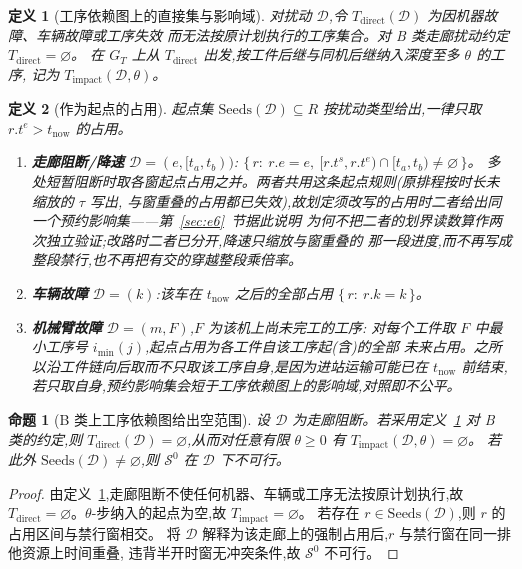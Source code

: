 \documentclass[manuscript,screen,review]{acmart}
\newtheorem{definition}{定义}
\newtheorem{prop}{命题}
\begin{document}
\begin{definition}[工序依赖图上的直接集与影响域]
\label{def:task_impact}
对扰动 \(\mathcal{D}\),令 \(T_{\mathrm{direct}}(\mathcal{D})\) 为因机器故障、车辆故障或工序失效
而无法按原计划执行的工序集合。对 B 类走廊扰动约定 \(T_{\mathrm{direct}}=\varnothing\)。
在 \(G_T\) 上从 \(T_{\mathrm{direct}}\) 出发,按工件后继与同机后继纳入深度至多 \(\theta\) 的工序,
记为 \(T_{\mathrm{impact}}(\mathcal{D},\theta)\)。
\end{definition}

\begin{definition}[作为起点的占用]
\label{def:seeds}
起点集 \(\mathrm{Seeds}(\mathcal{D})\subseteq R\) 按扰动类型给出,一律只取
\(r.t^e>t_{\mathrm{now}}\) 的占用。
\begin{enumerate}[label=(\alph*),leftmargin=1.6em,itemsep=0.15em]
\item \textbf{走廊阻断/降速} \(\mathcal{D}=(e,[t_a,t_b))\):
\(\{\,r:\ r.e=e,\ [r.t^s,r.t^e)\cap[t_a,t_b)\neq\varnothing\,\}\)。
多处短暂阻断时取各窗起点占用之并。两者共用这条起点规则(原排程按时长未缩放的 \(\tau\) 写出,
与窗重叠的占用都已失效),故划定须改写的占用时二者给出同一个预约影响集——第~\ref{sec:e6}~节据此说明
为何不把二者的划界读数算作两次独立验证;改路时二者已分开,降速只缩放与窗重叠的
那一段进度,而不再写成整段禁行,也不再把有交的穿越整段乘倍率。
\item \textbf{车辆故障} \(\mathcal{D}=(k)\):该车在 \(t_{\mathrm{now}}\) 之后的全部占用
\(\{\,r:\ r.k=k\,\}\)。
\item \textbf{机械臂故障} \(\mathcal{D}=(m,F)\),\(F\) 为该机上尚未完工的工序:
对每个工件取 \(F\) 中最小工序号 \(i_{\min}(j)\),起点占用为各工件自该工序起(含)的全部
未来占用。之所以沿工件链向后取而不只取该工序自身,是因为进站运输可能已在
\(t_{\mathrm{now}}\) 前结束,若只取自身,预约影响集会短于工序依赖图上的影响域,对照即不公平。
\end{enumerate}
\end{definition}

\begin{prop}[B 类上工序依赖图给出空范围]
\label{prop:miss}
设 \(\mathcal{D}\) 为走廊阻断。若采用定义~\ref{def:task_impact} 对 B 类的约定,则
\(T_{\mathrm{direct}}(\mathcal{D})=\varnothing\),从而对任意有限 \(\theta\ge 0\) 有
\(T_{\mathrm{impact}}(\mathcal{D},\theta)=\varnothing\)。
若此外 \(\mathrm{Seeds}(\mathcal{D})\neq\varnothing\),则 \(\mathcal{S}^0\) 在 \(\mathcal{D}\) 下不可行。
\end{prop}

\begin{proof}
由定义~\ref{def:task_impact},走廊阻断不使任何机器、车辆或工序无法按原计划执行,故
\(T_{\mathrm{direct}}=\varnothing\)。\(\theta\)-步纳入的起点为空,故
\(T_{\mathrm{impact}}=\varnothing\)。
若存在 \(r\in\mathrm{Seeds}(\mathcal{D})\),则 \(r\) 的占用区间与禁行窗相交。
将 \(\mathcal{D}\) 解释为该走廊上的强制占用后,\(r\) 与禁行窗在同一排他资源上时间重叠,
违背半开时窗无冲突条件,故 \(\mathcal{S}^0\) 不可行。
\end{proof}
\end{document}
